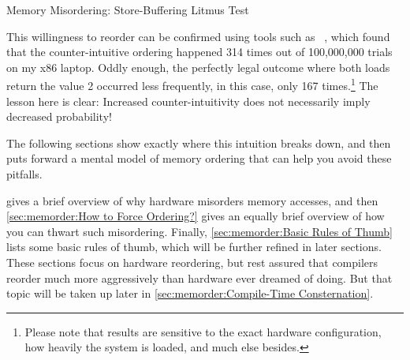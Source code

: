 \begin{listing}

\caption{Memory Misordering: Store-Buffering Litmus Test}
\label{lst:memorder:Memory Misordering: Store-Buffering Litmus Test}
\end{listing}

\QuickQuizEnd

This willingness to reorder can be confirmed using tools such as
~\cite{Alglave:2014:HCM:2594291.2594347},
which found that the counter-intuitive ordering happened
314 times out of 100,000,000 trials on my x86 laptop.
Oddly enough, the perfectly legal outcome where both loads return the
value 2 occurred less frequently, in this case, only 167 times.\footnote{
	Please note that results are sensitive to the exact hardware
	configuration,
	how heavily the system is loaded, and much else besides.}
The lesson here is clear: Increased counter-intuitivity does not necessarily
imply decreased probability!

The following sections show exactly where this intuition breaks down,
and then puts forward a mental model of memory ordering that can help
you avoid these pitfalls.

gives a brief overview of why hardware misorders memory accesses, and then
\cref{sec:memorder:How to Force Ordering?}
gives an equally brief overview of how you can thwart such misordering.
Finally, \cref{sec:memorder:Basic Rules of Thumb}
lists some basic rules of thumb, which will be further refined in
later sections.
These sections focus on hardware reordering, but rest assured that compilers
reorder much more aggressively than hardware ever dreamed of doing.
But that topic will be taken up later in
\cref{sec:memorder:Compile-Time Consternation}.

